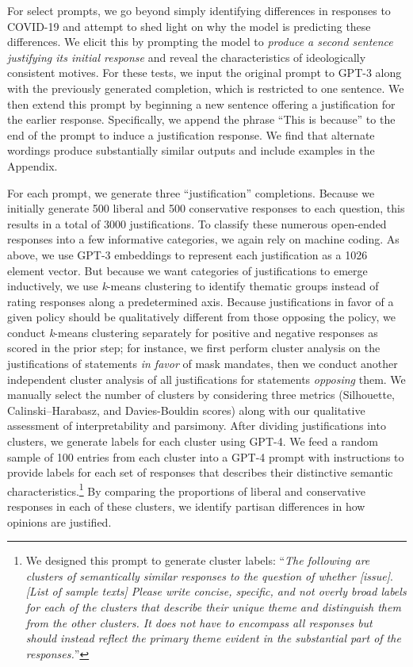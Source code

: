 \documentclass{article} %
\begin{document}
For select prompts, we go beyond simply identifying differences in
responses to COVID-19 and attempt to shed light on why the model is
predicting these differences. We elicit this by prompting the model to
\emph{produce a second sentence justifying its initial response} and
reveal the characteristics of ideologically consistent motives. For
these tests, we input the original prompt to GPT-3 along with the
previously generated completion, which is restricted to one sentence. We
then extend this prompt by beginning a new sentence offering a
justification for the earlier response. Specifically, we append the
phrase ``This is because'' to the end of the prompt to induce a
justification response. We find that alternate wordings produce
substantially similar outputs and include examples in the Appendix.

For each prompt, we generate three ``justification'' completions.
Because we initially generate 500 liberal and 500 conservative responses
to each question, this results in a total of 3000 justifications. To
classify these numerous open-ended responses into a few informative
categories, we again rely on machine coding. As above, we use GPT-3
embeddings to represent each justification as a 1026 element vector. But
because we want categories of justifications to emerge inductively, we
use \emph{k}-means clustering to identify thematic groups instead of
rating responses along a predetermined axis. Because justifications in
favor of a given policy should be qualitatively different from those
opposing the policy, we conduct \emph{k}-means clustering separately for
positive and negative responses as scored in the prior step; for
instance, we first perform cluster analysis on the justifications of
statements \emph{in favor} of mask mandates, then we conduct another
independent cluster analysis of all justifications for statements
\emph{opposing} them. We manually select the number of clusters by
considering three metrics (Silhouette, Calinski--Harabasz, and
Davies-Bouldin scores) along with our qualitative assessment of
interpretability and parsimony. After dividing justifications into
clusters, we generate labels for each cluster using GPT-4. We feed a
random sample of 100 entries from each cluster into a GPT-4 prompt with
instructions to provide labels for each set of responses that describes
their distinctive semantic characteristics.\footnote{We designed this
  prompt to generate cluster labels: ``\emph{The following are clusters
  of semantically similar responses to the question of whether
  {[}issue{]}}. \emph{{[}List of sample texts{]} Please write concise,
  specific, and not overly broad labels for each of the clusters that
  describe their unique theme and distinguish them from the other
  clusters. It does not have to encompass all responses but should
  instead reflect the primary theme evident in the substantial part of
  the responses.}''} By comparing the proportions of liberal and
conservative responses in each of these clusters, we identify partisan
differences in how opinions are justified.
\end{document}
